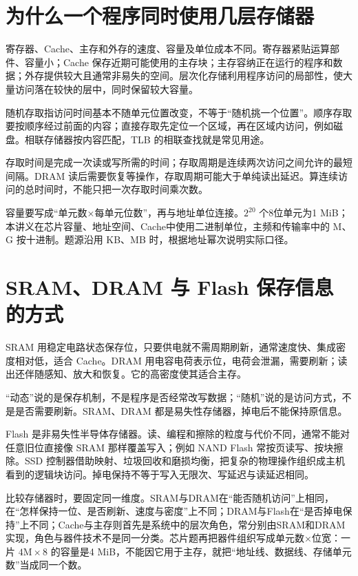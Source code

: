 \section{为什么一个程序同时使用几层存储器}\label{co-03-01}

寄存器、Cache、主存和外存的速度、容量及单位成本不同。寄存器紧贴运算部件、容量小；Cache 保存近期可能使用的主存块；主存容纳正在运行的程序和数据；外存提供较大且通常非易失的空间。层次化存储利用程序访问的局部性，使大量访问落在较快的层中，同时保留较大容量。

随机存取指访问时间基本不随单元位置改变，不等于``随机挑一个位置''。顺序存取要按顺序经过前面的内容；直接存取先定位一个区域，再在区域内访问，例如磁盘。相联存储器按内容匹配，TLB 的相联查找就是常见用途。

存取时间是完成一次读或写所需的时间；存取周期是连续两次访问之间允许的最短间隔。DRAM 读后需要恢复等操作，存取周期可能大于单纯读出延迟。算连续访问的总时间时，不能只把一次存取时间乘次数。

容量要写成``单元数×每单元位数''，再与地址单位连接。\(2^{20}\) 个8位单元为1 MiB；本讲义在芯片容量、地址空间、Cache中使用二进制单位，主频和传输率中的 M、G 按十进制。题源沿用 KB、MB 时，根据地址幂次说明实际口径。

\section{SRAM、DRAM 与 Flash 保存信息的方式}\label{co-03-02}

SRAM 用稳定电路状态保存位，只要供电就不需周期刷新，通常速度快、集成密度相对低，适合 Cache。DRAM 用电容电荷表示位，电荷会泄漏，需要刷新；读出还伴随感知、放大和恢复。它的高密度使其适合主存。

``动态''说的是保存机制，不是程序是否经常改写数据；``随机''说的是访问方式，不是是否需要刷新。SRAM、DRAM 都是易失性存储器，掉电后不能保持原信息。

Flash 是非易失性半导体存储器。读、编程和擦除的粒度与代价不同，通常不能对任意旧位直接像 SRAM 那样覆盖写入；例如 NAND Flash 常按页读写、按块擦除。SSD 控制器借助映射、垃圾回收和磨损均衡，把复杂的物理操作组织成主机看到的逻辑块访问。掉电保持不等于写入无限次、写延迟与读延迟相同。

比较存储器时，要固定同一维度。SRAM与DRAM在``能否随机访问''上相同，在``怎样保持一位、是否刷新、速度与密度''上不同；DRAM与Flash在``是否掉电保持''上不同；Cache与主存则首先是系统中的层次角色，常分别由SRAM和DRAM实现，角色与器件技术不是同一分类。芯片题再把器件组织写成单元数×位宽：一片 \(4\mathrm M\times8\) 的容量是4 MiB，不能因它用于主存，就把``地址线、数据线、存储单元数''当成同一个数。

